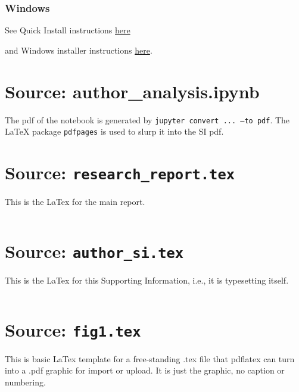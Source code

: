 \documentclass[helv,letter,doc,natbib,11pt]{apa6}  %
\begin{document}
\subsubsection{Windows}


See Quick Install instructions 
\href{https://www.tug.org/texlive/quickinstall.html}{here}

and Windows installer instructions
\href{https://www.tug.org/texlive/acquire-netinstall.html}{here}.



\newpage
\normalsize
\section{Source: author\_analysis.ipynb}

The pdf of the notebook is generated by {\tt jupyter convert ... --to pdf}. The
LaTeX{} package {\tt pdfpages} is used to slurp it into the SI pdf.




\newpage
\section{Source: {\tt research\_report.tex}}
This is the LaTex{} for the main report. 

\inputminted{latex}{apa_ms.tex}


\newpage
\section{Source: {\tt author\_si.tex}}

This is the LaTex{} for this Supporting Information, i.e., it is 
typesetting itself. 

\inputminted{latex}{apa_si.tex}


\newpage
\section{Source: {\tt fig1.tex}}
This is basic LaTex{} template for a free-standing .tex file that pdflatex can turn
into a .pdf graphic for import or upload. It is just the graphic, no caption or numbering.
\end{document}
